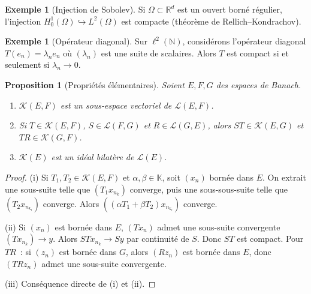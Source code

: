 \documentclass[a4paper,12pt]{book}
\newcommand{\N}{\mathbb{N}}
\newcommand{\R}{\mathbb{R}}
\newcommand{\K}{\mathbb{K}}
\theoremstyle{definition}
\newtheorem{exemple}[definition]{Exemple}
\theoremstyle{plain}
\newtheorem{proposition}[definition]{Proposition}
\theoremstyle{remark}
\begin{document}
\begin{exemple}[Injection de Sobolev]
\label{ex:sobolev-compact}
Si $\Omega \subset \R^d$ est un ouvert borné régulier, l'injection
$H^1_0(\Omega) \hookrightarrow L^2(\Omega)$ est compacte
(théorème de Rellich--Kondrachov).
\end{exemple}

\begin{exemple}[Opérateur diagonal]
\label{ex:op-diagonal-compact}
Sur $\ell^2(\N)$, considérons l'opérateur diagonal $T(e_n) = \lambda_n e_n$ où
$(\lambda_n)$ est une suite de scalaires. Alors $T$ est compact si et seulement si
$\lambda_n \to 0$.
\end{exemple}

\begin{proposition}[Propriétés élémentaires]
\label{prop:prop-compact}
Soient $E, F, G$ des espaces de Banach.
\begin{enumerate}[label=(\roman*)]
  \item $\mathcal{K}(E,F)$ est un sous-espace vectoriel de $\mathcal{L}(E,F)$.
  \item Si $T \in \mathcal{K}(E,F)$, $S \in \mathcal{L}(F,G)$ et
        $R \in \mathcal{L}(G,E)$, alors $ST \in \mathcal{K}(E,G)$ et
        $TR \in \mathcal{K}(G,F)$.
  \item $\mathcal{K}(E)$ est un idéal bilatère de $\mathcal{L}(E)$.
\end{enumerate}
\end{proposition}

\begin{proof}
(i) Si $T_1, T_2 \in \mathcal{K}(E,F)$ et $\alpha, \beta \in \K$, soit $(x_n)$ bornée
dans $E$. On extrait une sous-suite telle que $(T_1 x_{n_k})$ converge, puis une
sous-sous-suite telle que $(T_2 x_{n_{k_l}})$ converge. Alors
$((\alpha T_1 + \beta T_2) x_{n_{k_l}})$ converge.

(ii) Si $(x_n)$ est bornée dans $E$, $(Tx_n)$ admet une sous-suite convergente
$(Tx_{n_k}) \to y$. Alors $STx_{n_k} \to Sy$ par continuité de $S$. Donc $ST$ est
compact. Pour $TR$~: si $(z_n)$ est bornée dans $G$, alors $(Rz_n)$ est bornée dans $E$,
donc $(TRz_n)$ admet une sous-suite convergente.

(iii) Conséquence directe de (i) et (ii).
\end{proof}

\end{document}
